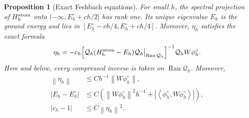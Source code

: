 \documentclass[11pt]{article}
\newtheorem{proposition}[theorem]{Proposition}
\newcommand{\cQ}{\mathcal Q}
\newcommand{\abs}[1]{\left|#1\right|}
\newcommand{\norm}[1]{\left\|#1\right\|}
\newcommand{\ip}[2]{\left\langle #1,#2\right\rangle}
\newcommand{\Ran}{\operatorname{Ran}}
\begin{document}
\begin{proposition}[Exact Feshbach equations]\label{prop:Feshbach}
For small $h$, the spectral projection of $H_h^{\rm atom}$ onto
$(-\infty,E_h^\circ+ch/2]$ has rank one.  Its unique eigenvalue $E_h$ is the
ground energy and lies in $[E_h^\circ-ch/4,E_h^\circ+ch/4]$.  Moreover, $\eta_h$ satisfies the exact formula
\begin{equation}\label{eq:eta-Feshbach}
 \eta_h
 =-c_h\Bigl[\cQ_h(H_h^{\rm atom}-E_h)\cQ_h\big|_{\Ran\cQ_h}\Bigr]^{-1}
 \cQ_hW\phi_h^\circ.
\end{equation}
Here and below, every compressed inverse is taken on $\Ran\cQ_h$.
Moreover,
\begin{align}
 \norm{\eta_h}
 &\le Ch^{-1}\norm{W\phi_h^\circ},\label{eq:eta-L2}\\
 |E_h-E_h^\circ|
 &\le C\left(\norm{W\phi_h^\circ}^2h^{-1}
 +\abs{\ip{\phi_h^\circ}{W\phi_h^\circ}}\right),\label{eq:energy-shift}\\
 |c_h-1|&\le C\norm{\eta_h}^2.
 \label{eq:c-close}
\end{align}
\end{proposition}
\end{document}
